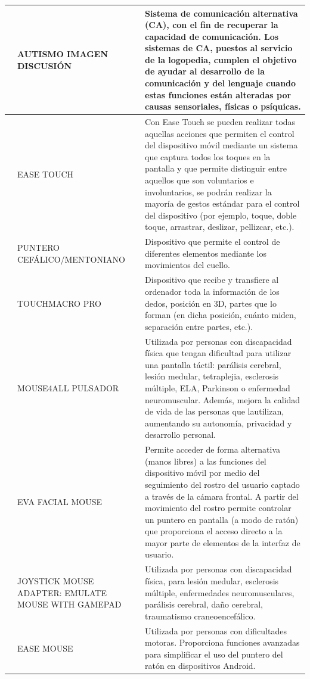 \documentclass[spanish]{textolivre}
\begin{document}
\begin{small}
\begin{longtable}{
    p{}
    p{}    
    p{}    }
 & AUTISMO IMAGEN DISCUSIÓN & Sistema de comunicación alternativa (CA), con el fin de recuperar la capacidad de comunicación. Los sistemas de CA, puestos al servicio de la logopedia, cumplen el objetivo de ayudar al desarrollo de la comunicación y del lenguaje cuando estas funciones están alteradas por causas sensoriales, físicas o psíquicas. \\
\midrule
\parbox[t]{2mm}{} & EASE TOUCH & Con Ease Touch se pueden realizar todas aquellas acciones que permiten el control del dispositivo móvil mediante un sistema que captura todos los toques en la pantalla y que permite distinguir entre aquellos que son voluntarios e involuntarios, se podrán realizar la mayoría de gestos estándar para el control del dispositivo (por ejemplo, toque, doble toque, arrastrar, deslizar, pellizcar, etc.). \\
 & PUNTERO CEFÁLICO/MENTONIANO & Dispositivo que permite el control de diferentes elementos mediante los movimientos del cuello. \\
 & TOUCHMACRO PRO & Dispositivo que recibe y transfiere al ordenador toda la información de los dedos, posición en 3D, partes que lo forman (en dicha posición, cuánto miden, separación entre partes, etc.). \\
 & MOUSE4ALL PULSADOR & Utilizada por personas con discapacidad física que tengan dificultad para utilizar una pantalla táctil: parálisis cerebral, lesión medular, tetraplejia, esclerosis múltiple, ELA, Parkinson o enfermedad neuromuscular. Además, mejora la calidad de vida de las personas que lautilizan, aumentando su autonomía, privacidad y desarrollo personal. \\
 & EVA FACIAL MOUSE & Permite acceder de forma alternativa (manos libres) a las funciones del dispositivo móvil por medio del seguimiento del rostro del usuario captado a través de la cámara frontal. A partir del movimiento del rostro permite controlar un puntero en pantalla (a modo de ratón) que proporciona el acceso directo a la mayor parte de elementos de la interfaz de usuario. \\
 & JOYSTICK MOUSE ADAPTER: EMULATE MOUSE WITH GAMEPAD & Utilizada por personas con discapacidad física, para lesión medular, esclerosis múltiple, enfermedades neuromusculares, parálisis cerebral, daño cerebral, traumatismo craneoencefálico. \\
 & EASE MOUSE & Utilizada por personas con dificultades motoras. Proporciona funciones avanzadas para simplificar el uso del puntero del ratón en dispositivos Android. \\

\end{longtable}
\end{small}
\end{document}
